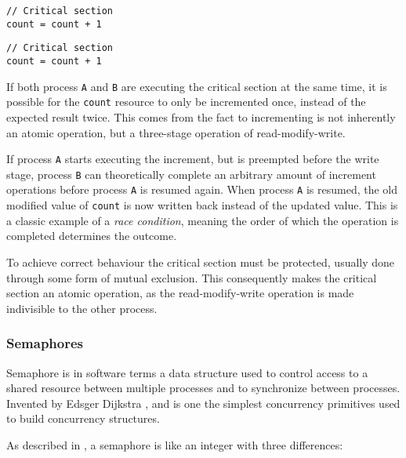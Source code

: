 \noindent\begin{minipage}{0.45\textwidth}
\begin{lstlisting}[title={Process A},style={CustomC},frame={},xleftmargin={4em}]
// Critical section
count = count + 1
\end{lstlisting}
\end{minipage}
\begin{minipage}{0.45\textwidth}
\begin{lstlisting}[title={Process B},style={CustomC},frame={},xleftmargin={4em}]
// Critical section
count = count + 1
\end{lstlisting}
\end{minipage}

If both process \texttt{A} and \texttt{B} are executing the critical section at the same time, it is possible for the \texttt{count} resource to only be incremented once, instead of the expected result twice. This comes from the fact to incrementing is not inherently an atomic operation, but a three\hyp{}stage operation of read\hyp{}modify\hyp{}write. 

If process \texttt{A} starts executing the increment, but is preempted before the write stage, process \texttt{B} can theoretically complete an arbitrary amount of increment operations before process \texttt{A} is resumed again. When process \texttt{A} is resumed, the old modified value of \texttt{count} is now written back instead of the updated value. This is a classic example of a \textit{race condition}, meaning the order of which the operation is completed determines the outcome.

To achieve correct behaviour the critical section must be protected, usually done through some form of mutual exclusion. This consequently makes the critical section an atomic operation, as the read\hyp{}modify\hyp{}write operation is made indivisible to the other process.


\subsubsection{Semaphores}

Semaphore is in software terms a data structure used to control access to a shared resource between multiple processes and to synchronize between processes. Invented by Edsger Dijkstra \citep{dijkstra}, and is one the simplest concurrency primitives used to build concurrency structures.

As described in \citet[chapter 2]{downey2016}, a semaphore is like an integer with three differences:

